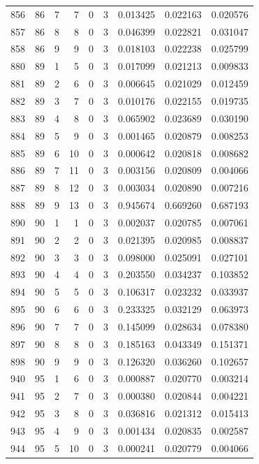 \begin{longtable}{rrrrrrrrr}
856 & 86 & 7 & 7 & 0 & 3 & 0.013425 & 0.022163 & 0.020576 \\
857 & 86 & 8 & 8 & 0 & 3 & 0.046399 & 0.022821 & 0.031047 \\
858 & 86 & 9 & 9 & 0 & 3 & 0.018103 & 0.022238 & 0.025799 \\
880 & 89 & 1 & 5 & 0 & 3 & 0.017099 & 0.021213 & 0.009833 \\
881 & 89 & 2 & 6 & 0 & 3 & 0.006645 & 0.021029 & 0.012459 \\
882 & 89 & 3 & 7 & 0 & 3 & 0.010176 & 0.022155 & 0.019735 \\
883 & 89 & 4 & 8 & 0 & 3 & 0.065902 & 0.023689 & 0.030190 \\
884 & 89 & 5 & 9 & 0 & 3 & 0.001465 & 0.020879 & 0.008253 \\
885 & 89 & 6 & 10 & 0 & 3 & 0.000642 & 0.020818 & 0.008682 \\
886 & 89 & 7 & 11 & 0 & 3 & 0.003156 & 0.020809 & 0.004066 \\
887 & 89 & 8 & 12 & 0 & 3 & 0.003034 & 0.020890 & 0.007216 \\
888 & 89 & 9 & 13 & 0 & 3 & 0.945674 & 0.669260 & 0.687193 \\
890 & 90 & 1 & 1 & 0 & 3 & 0.002037 & 0.020785 & 0.007061 \\
891 & 90 & 2 & 2 & 0 & 3 & 0.021395 & 0.020985 & 0.008837 \\
892 & 90 & 3 & 3 & 0 & 3 & 0.098000 & 0.025091 & 0.027101 \\
893 & 90 & 4 & 4 & 0 & 3 & 0.203550 & 0.034237 & 0.103852 \\
894 & 90 & 5 & 5 & 0 & 3 & 0.106317 & 0.023232 & 0.033937 \\
895 & 90 & 6 & 6 & 0 & 3 & 0.233325 & 0.032129 & 0.063973 \\
896 & 90 & 7 & 7 & 0 & 3 & 0.145099 & 0.028634 & 0.078380 \\
897 & 90 & 8 & 8 & 0 & 3 & 0.185163 & 0.043349 & 0.151371 \\
898 & 90 & 9 & 9 & 0 & 3 & 0.126320 & 0.036260 & 0.102657 \\
940 & 95 & 1 & 6 & 0 & 3 & 0.000887 & 0.020770 & 0.003214 \\
941 & 95 & 2 & 7 & 0 & 3 & 0.000380 & 0.020844 & 0.004221 \\
942 & 95 & 3 & 8 & 0 & 3 & 0.036816 & 0.021312 & 0.015413 \\
943 & 95 & 4 & 9 & 0 & 3 & 0.001434 & 0.020835 & 0.002587 \\
944 & 95 & 5 & 10 & 0 & 3 & 0.000241 & 0.020779 & 0.004066 \\

\end{longtable}
